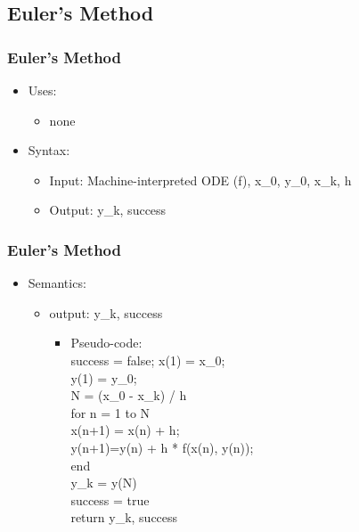 \documentclass{beamer}
\begin{document}

\subsection {Euler's Method}

\begin{frame}
\frametitle{Euler's Method}
\begin{itemize}
\item Uses:
	\begin{itemize}
		\item none
	\end{itemize}
\item Syntax:
	\begin{itemize}
		\item Input: Machine-interpreted ODE (f), x\_0, y\_0, x\_k, h
		\item Output: y\_k, success
	\end{itemize}
\end{itemize}
\end{frame}

\begin{frame}
\frametitle{Euler's Method}
\begin{itemize}
\item Semantics:
	\begin{itemize}
		\item output: y\_k, success\\
		\begin{itemize}
		\item Pseudo-code:\\
			success = false;
			x(1) = x\_0;\\
			y(1) = y\_0;\\
			N =  (x\_0 - x\_k) / h\\
			for n = 1 to N \\%
				x(n+1) = x(n) + h;\\
				y(n+1)=y(n) + h * f(x(n), y(n));\\
			end\\
			y\_k = y(N)\\
			success = true\\
			return y\_k, success
		\end{itemize}
	\end{itemize}
\end{itemize}
\end{frame}

\end{document}
